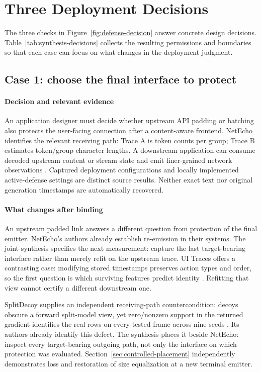 \section{Three Deployment Decisions}\label{sec:discussion}
The three checks in Figure~\ref{fig:defense-decision} answer concrete design decisions. Table~\ref{tab:synthesis-decisions} collects the resulting permissions and boundaries so that each case can focus on what changes in the deployment judgment.

\subsection{Case 1: choose the final interface to protect}
\paragraph{Decision and relevant evidence}
An application designer must decide whether upstream API padding or batching also protects the user-facing connection after a content-aware frontend. NetEcho identifies the relevant receiving path: Trace A is token counts per group; Trace B estimates token/group character lengths. A downstream application can consume decoded upstream content or stream state and emit finer-grained network observations \cite{netecho2025}. Captured deployment configurations and locally implemented active-defense settings are distinct source results. Neither exact text nor original generation timestamps are automatically recovered.

\paragraph{What changes after binding}
An upstream padded link answers a different question from protection of the final emitter. NetEcho's authors already establish re-emission in their systems. The joint synthesis specifies the next measurement: capture the last target-bearing interface rather than merely refit on the upstream trace. UI Traces offers a contrasting case: modifying stored timestamps preserves action types and order, so the first question is which surviving features predict identity \cite{uitraces2026}. Refitting that view cannot certify a different downstream one.

SplitDecoy supplies an independent receiving-path countercondition: decoys obscure a forward split-model view, yet zero/nonzero support in the returned gradient identifies the real rows on every tested frame across nine seeds \cite[Sections 5.1--5.3]{politis2026splitdecoy}. Its authors already identify this defect. The synthesis places it beside NetEcho: inspect every target-bearing outgoing path, not only the interface on which protection was evaluated. Section~\ref{sec:controlled-placement} independently demonstrates loss and restoration of size equalization at a new terminal emitter.

